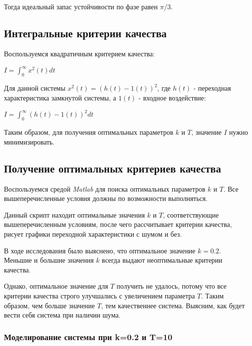 \documentclass[14pt,a4paper,report]{report}
\begin{document}
	Тогда идеальный запас устойчивости по фазе равен $\pi/3$.
	
	\subsection{Интегральные критерии качества}
	
	Воспользуемся квадратичным критерием качества:
	
	\begin{center}
		$I=\int_{0}^{\infty}x^2(t)dt$
	\end{center}
	
	Для данной системы $x^2(t)=(h(t)-1(t))^2$, где $h(t)$ - переходная характеристика замкнутой системы, а $1(t)$ - входное воздействие:
	
	\begin{center}
		$I=\int_{0}^{\infty}(h(t)-1(t))^2dt$
	\end{center}
	
	Таким образом, для получения оптимальных параметров $k$ и $T$, значение $I$  нужно минимизировать.
	
	\subsection{Получение оптимальных критериев качества}
	
	Воспользуемся средой \emph{Matlab} для поиска оптимальных параметров $k$ и $T$. Все вышеперечисленные условия должны по возможности выполняться.
	
%	
	
	Данный скрипт находит оптимальные значения $k$ и $T$, соответствующие вышеперечисленным условиям, после чего рассчитывает критерии качества, рисует графики переходной характеристики с шумом и без.
	
	В ходе исследования было выяснено, что оптимальное значение $k=0.2$. Меньшие и большие значения $k$ всегда выдают неоптимальные критерии качества.
	
	Однако, оптимальное значение для $T$ получить не удалось, потому что все критерии качества строго улучшались с увеличением параметра $T$. Таким образом, чем больше значение $T$, тем качественнее система. Выясним, как будет вести себя система при наличии шума. 
	
	\subsubsection{Моделирование системы при k=0.2 и T=10}
	
\end{document}
